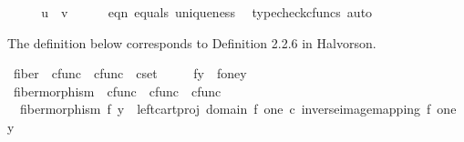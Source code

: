 \begin{isabellebody}
\ \ \isamarkupfalse%
\ \isamarkupfalse%
\ {\isachardoublequoteopen}u\ {\isacharequal}{\kern0pt}\ v{\isachardoublequoteclose}\isanewline
\ \ \ \ \isamarkupfalse%
\ eqn{}\ equals\ uniqueness\ \isamarkupfalse%
\ {\isacharparenleft}{\kern0pt}typecheck{\isacharunderscore}{\kern0pt}cfuncs{\isacharcomma}{\kern0pt}\ auto{\isacharparenright}{\kern0pt}\isanewline
{}\isamarkupfalse%
%
\endisatagproof
{\isafoldproof}%
%
\isadelimproof
%
\endisadelimproof
%
\isadelimdocument
%
\endisadelimdocument
%
\isatagdocument
%
\isamarkuptrue%
%
\endisatagdocument
{\isafolddocument}%
%
\isadelimdocument
%
\endisadelimdocument
%
\begin{isamarkuptext}%
The definition below corresponds to Definition 2.2.6 in Halvorson.%
\end{isamarkuptext}\isamarkuptrue%
\isamarkupfalse%
\ fiber\ {\isacharcolon}{\kern0pt}{\isacharcolon}{\kern0pt}\ {\isachardoublequoteopen}cfunc\ {\isasymRightarrow}\ cfunc\ {\isasymRightarrow}\ cset{\isachardoublequoteclose}\ {\isacharparenleft}{\kern0pt}{\isachardoublequoteopen}{\isacharunderscore}{\kern0pt}\isactrlsup {\isacharminus}{\kern0pt}\ {\isacharbrackleft}{\kern0pt}{}{}{}{\isacharcomma}{\kern0pt}{}{}{}{\isacharbrackright}{\kern0pt}{}{}{}{\isacharparenright}{\kern0pt}\ \isanewline
\ \ {\isachardoublequoteopen}f\isactrlsup {\isacharminus}{\kern0pt}y{\isacharbraceright}{\kern0pt}\ {\isacharequal}{\kern0pt}\ {\isacharparenleft}{\kern0pt}f\isactrlsup {\isacharminus}{\kern0pt}one{\isasymrparr}\isactrlbsub y\isactrlesub {\isacharparenright}{\kern0pt}{\isachardoublequoteclose}\isanewline
\isanewline
{}\isamarkupfalse%
\ fiber{\isacharunderscore}{\kern0pt}morphism\ {\isacharcolon}{\kern0pt}{\isacharcolon}{\kern0pt}\ {\isachardoublequoteopen}cfunc\ {\isasymRightarrow}\ cfunc\ {\isasymRightarrow}\ cfunc{\isachardoublequoteclose}\ \isanewline
\ \ {\isachardoublequoteopen}fiber{\isacharunderscore}{\kern0pt}morphism\ f\ y\ {\isacharequal}{\kern0pt}\ left{\isacharunderscore}{\kern0pt}cart{\isacharunderscore}{\kern0pt}proj\ {\isacharparenleft}{\kern0pt}domain\ f{\isacharparenright}{\kern0pt}\ one\ {\isasymcirc}\isactrlsub c\ inverse{\isacharunderscore}{\kern0pt}image{\isacharunderscore}{\kern0pt}mapping\ f\ one\ y{\isachardoublequoteclose}\isanewline

\end{isabellebody}
